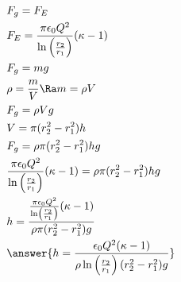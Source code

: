 {\begin{enumerate}
    \begin{align*}
        &F_g=F_E\\
        &F_E=\frac{\pi\epsilon_0Q^2}{\ln\left(\frac{r_2}{r_1}\right)}(\kappa-1)\\
        &F_g=mg\\
        &\rho=\frac{m}{V}\Ra m=\rho V\\
        &F_g=\rho Vg\\
        &V=\pi (r_2^2-r_1^2)h\\
        &F_g=\rho\pi (r_2^2-r_1^2)hg\\
        &\frac{\pi\epsilon_0Q^2}{\ln\left(\frac{r_2}{r_1}\right)}(\kappa-1)=\rho\pi (r_2^2-r_1^2)hg\\
        &h=\frac{\frac{\pi\epsilon_0Q^2}{\ln\left(\frac{r_2}{r_1}\right)}(\kappa-1)}{\rho\pi (r_2^2-r_1^2)g}\\
        &\answer{h=\frac{\epsilon_0Q^2(\kappa-1)}{\rho\ln\left(\frac{r_2}{r_1}\right)(r_2^2-r_1^2)g}}
    \end{align*}
\end{enumerate}
}{}
